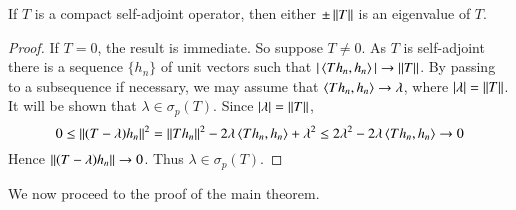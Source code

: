 \begin{lem}
    If $T$ is a compact self-adjoint operator, then either $\pm\left|\left| T\right|\right|$ is an eigenvalue of $T$.
\end{lem}
\begin{proof}
    If $T = 0$, the result is immediate. So suppose $T \neq 0$. As $T$ is self-adjoint there is a sequence $\{h_n\}$ of unit vectors such that $|\left\langle Th_n, h_n\right\rangle|\rightarrow \left|\left| T\right|\right|$. By passing to a subsequence if necessary, we may assume that $\left\langle Th_n, h_n\right\rangle\rightarrow \lambda$, where $|\lambda| = \left|\left| T\right|\right|$. It will be shown that $\lambda \in \sigma_p(T)$. Since $|\lambda| = \left|\left| T\right|\right|$, $$0 \leq \left|\left| (T-\lambda)h_n\right|\right|^2 = \left|\left| Th_n\right|\right|^2-2\lambda \left\langle Th_n, h_n\right\rangle+\lambda^2 \leq 2\lambda^2 - 2\lambda \left\langle Th_n, h_n\right\rangle\rightarrow 0$$
    Hence $\left|\left| (T-\lambda)h_n\right|\right| \rightarrow 0$. Thus $\lambda \in \sigma_p(T)$.
\end{proof}


We now proceed to the proof of the main theorem.

